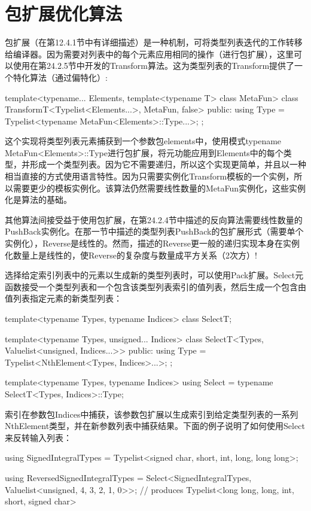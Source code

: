 \section{包扩展优化算法}
包扩展（在第12.4.1节中有详细描述）是一种机制，可将类型列表迭代的工作转移给编译器。因为需要对列表中的每个元素应用相同的操作（进行包扩展），这里可以使用在第24.2.5节中开发的Transform算法。这为类型列表的Transform提供了一个特化算法（通过偏特化）:

\begin{cpp}
template<typename... Elements, template<typename T> class MetaFun>
class TransformT<Typelist<Elements...>, MetaFun, false> {
	public:
	using Type = Typelist<typename MetaFun<Elements>::Type...>;
};
\end{cpp}

这个实现将类型列表元素捕获到一个参数包elements中，使用模式typename MetaFun<Elements>::Type进行包扩展，将元功能应用到Elements中的每个类型，并形成一个类型列表。因为它不需要递归，所以这个实现更简单，并且以一种相当直接的方式使用语言特性。因为只需要实例化Transform模板的一个实例，所以需要更少的模板实例化。该算法仍然需要线性数量的MetaFun实例化，这些实例化是算法的基础。

其他算法间接受益于使用包扩展，在第24.2.4节中描述的反向算法需要线性数量的PushBack实例化。在那一节中描述的类型列表PushBack的包扩展形式（需要单个实例化），Reverse是线性的。然而，描述的Reverse更一般的递归实现本身在实例化数量上是线性的，使Reverse的复杂度与数量成平方关系（2次方）!

选择给定索引列表中的元素以生成新的类型列表时，可以使用Pack扩展。Select元函数接受一个类型列表和一个包含该类型列表索引的值列表，然后生成一个包含由值列表指定元素的新类型列表：

\begin{cpp}
template<typename Types, typename Indices>
class SelectT;

template<typename Types, unsigned... Indices>
class SelectT<Types, Valuelist<unsigned, Indices...>> {
	public:
	using Type = Typelist<NthElement<Types, Indices>...>;
};

template<typename Types, typename Indices>
using Select = typename SelectT<Types, Indices>::Type;
\end{cpp}

索引在参数包Indices中捕获，该参数包扩展以生成索引到给定类型列表的一系列NthElement类型，并在新参数列表中捕获结果。下面的例子说明了如何使用Select来反转输入列表：

\begin{cpp}
using SignedIntegralTypes =
	Typelist<signed char, short, int, long, long long>;

using ReversedSignedIntegralTypes =
	Select<SignedIntegralTypes, Valuelist<unsigned, 4, 3, 2, 1, 0>>;
	// produces Typelist<long long, long, int, short, signed char>
\end{cpp}

